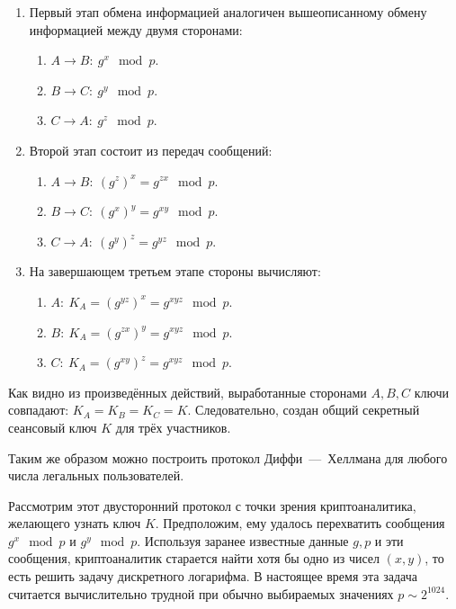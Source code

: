 \begin{enumerate}
    \item Первый этап обмена информацией аналогичен вышеописанному обмену информацией между двумя сторонами:
        \begin{enumerate}
            \item $A \rightarrow B: ~ g^x \mod p$.
            \item $B \rightarrow C: ~ g^y \mod p$.
            \item $C \rightarrow A: ~ g^z \mod p$.
        \end{enumerate}
    \item Второй этап состоит из передач сообщений:
        \begin{enumerate}
            \item $A \rightarrow B: ~ (g^z)^x = g^{zx} \mod p$.
            \item $B \rightarrow C: ~ (g^x)^y = g^{xy} \mod p$.
            \item $C \rightarrow A: ~ (g^y)^z = g^{yz} \mod p$.
        \end{enumerate}
    \item На завершающем третьем этапе стороны вычисляют:
        \begin{enumerate}
            \item $A: ~ K_A = (g^{yz})^x = g^{xyz} \mod p$.
            \item $B: ~ K_A = (g^{zx})^y = g^{xyz} \mod p$.
            \item $C: ~ K_A = (g^{xy})^z = g^{xyz} \mod p$.
        \end{enumerate}
\end{enumerate}

Как видно из произведённых действий, выработанные сторонами $A, B, C$ ключи совпадают: $K_A = K_B = K_C = K$. Следовательно, создан общий секретный сеансовый ключ $K$ для трёх участников.

Таким же образом можно построить протокол Диффи~---~Хеллмана для любого числа легальных пользователей.

Рассмотрим этот двусторонний протокол с точки зрения криптоаналитика, желающего узнать ключ $K$. Предположим, ему удалось перехватить сообщения $g^{x}\mod p$ и $g^{y}\mod p $. Используя заранее известные данные $g,p $ и эти сообщения, криптоаналитик старается найти хотя бы одно из чисел $(x,y)$, то есть решить задачу дискретного логарифма. В настоящее время эта задача считается вычислительно трудной при обычно выбираемых значениях $p\sim 2^{1024}$.

